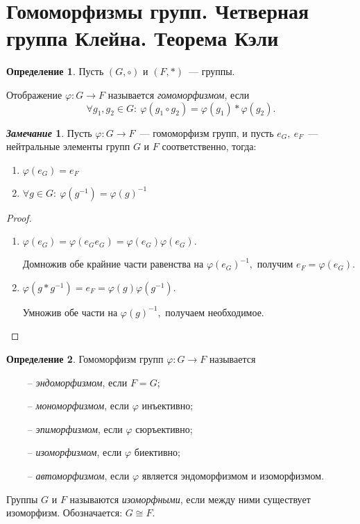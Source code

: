 \documentclass[a4paper, 14pt]{extarticle}
\newcommand{\n}{\par}
\renewcommand{\phi}{\varphi}
\theoremstyle{definition}
\newtheorem*{remark}{\textit{Замечание}}
\newtheorem{definition}{Определение}
\theoremstyle{plain}
\numberwithin{theorem}{section}
\numberwithin{definition}{section}
\numberwithin{statement}{section}
\numberwithin{lemma}{section}
\numberwithin{consequence}{section}
\begin{document}
	\section{Гомоморфизмы групп. Четверная группа Клейна. Теорема Кэли}
	\setcounter{definition}{0}
	\begin{definition}
		Пусть $(G, \circ)$ и $( F, *)$~--- группы.
		\n
		Отображение $\phi: G \rightarrow F$ называется \textit{гомоморфизмом}, если
		\begin{equation*}
			\forall g_1, g_2 \in G{:} \ \phi(g_1 \circ g_2) = \phi(g_1) * \phi(g_2).
		\end{equation*}
	\end{definition}
	\begin{remark}
		Пусть ${\phi: G \rightarrow F}$~--- гомоморфизм групп, и пусть ${e_G, \ e_F}$~--- нейтральные элементы групп $G$ и $F$ соответственно, тогда:
		\begin{enumerate}
			\setlength\itemsep{0.1em}
			\item $\phi(e_G) = e_F$
			\item $\forall g \in G{:} \ \phi(g^{-1}) = \phi(g)^{-1}$
		\end{enumerate}
	\end{remark}
	\begin{proof}
		\
		\begin{enumerate}
			\setlength\itemsep{0.1em}
			\item $\phi(e_G) = \phi(e_Ge_G) = \phi(e_G)\phi(e_G).$ \n
			Домножив обе крайние части равенства на $\phi(e_G)^{-1},$ получим
			${e_F = \phi(e_G).}$
			\item $\phi(g * g^{-1}) = e_F = \phi(g)\phi(g^{-1}).$ \n
			Умножив обе части на $\phi(g)^{-1},$ получаем необходимое. \qedhere
		\end{enumerate}
	\end{proof}
	\begin{definition}
		Гомоморфизм групп ${\phi: G \rightarrow F}$ называется 
		\begin{itemize}
			\item [~--] \textit{эндоморфизмом}, если $F = G$;
			\item [~--] \textit{мономорфизмом}, если $\phi$ инъективно;
			\item [~--] \textit{эпиморфизмом}, если $\phi$ сюръективно;
			\item [~--] \textit{изоморфизмом}, если $\phi$ биективно;
			\item [~--] \textit{автоморфизмом}, если $\phi$ является эндоморфизмом и изоморфизмом.
		\end{itemize} \n
		Группы $G$ и $F$ называются \textit{изоморфными}, если между ними существует изоморфизм. Обозначается: $G \cong F.$
	\end{definition}
\end{document}
